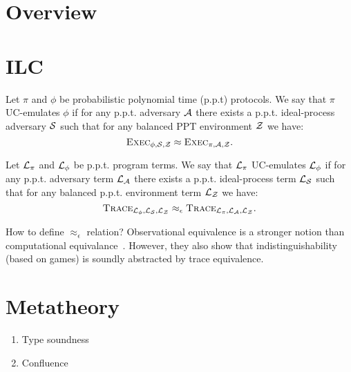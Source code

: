 \documentclass[acmsmall,review,anonymous]{acmart}\settopmatter{printfolios=true,printccs=false,printacmref=false}
\begin{document}
\section{Overview}\label{sec:overview}

\section{ILC}\label{sec:ilc}

\begin{definition}
Let $\pi$ and $\phi$ be probabilistic polynomial time (p.p.t) protocols. We say
that $\pi$ UC-emulates $\phi$ if for any p.p.t. adversary $\mathcal{A}$ there exists a
p.p.t. ideal-process adversary $\mathcal{S}$ such that for any balanced PPT environment
$\mathcal{Z}$ we have:
\begin{equation*}
\textsc{Exec}_{\phi, \mathcal{S}, \mathcal{Z}} \approx \textsc{Exec}_{\pi, \mathcal{A}, \mathcal{Z}}.
\end{equation*}
\end{definition}

\begin{definition}
Let $\mathcal{L}_{\pi}$ and $\mathcal{L}_{\phi}$ be p.p.t. program terms. We say that
$\mathcal{L}_{\pi}$ UC-emulates $\mathcal{L}_{\phi}$ if for any p.p.t. adversary term
$\mathcal{L}_{\mathcal{A}}$ there exists a p.p.t. ideal-process term $\mathcal{L}_{\mathcal{S}}$
such that for any balanced p.p.t. environment term $\mathcal{L}_{\mathcal{Z}}$ we have:
\begin{equation*}
\textsc{Trace}_{\mathcal{L}_{\phi}, \mathcal{L}_{\mathcal{S}}, \mathcal{L}_{\mathcal{Z}}} \approx_{\epsilon} \textsc{Trace}_{\mathcal{L}_{\pi}, \mathcal{L}_{\mathcal{A}}, \mathcal{L}_{\mathcal{Z}}}.
\end{equation*}
\end{definition}

How to define $\approx_{\epsilon}$ relation? Observational equivalence is a
stronger notion than computational
equivalance~\cite{comon2008computational}. However, they also show that
indistinguishability (based on games) is soundly abstracted by trace
equivalence.

\section{Metatheory}\label{sec:metatheory}

\begin{enumerate}
\item Type soundness
\item Confluence
\end{enumerate}
\end{document}
